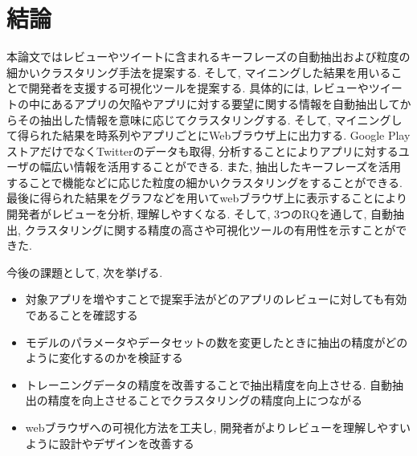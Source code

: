 \chapter{結論}
\label{chap:keturon}

本論文ではレビューやツイートに含まれるキーフレーズの自動抽出および粒度の細かいクラスタリング手法を提案する. そして, マイニングした結果を用いることで開発者を支援する可視化ツールを提案する. 
具体的には, レビューやツイートの中にあるアプリの欠陥やアプリに対する要望に関する情報を自動抽出してからその抽出した情報を意味に応じてクラスタリングする.  そして, マイニングして得られた結果を時系列やアプリごとにWebブラウザ上に出力する.
Google PlayストアだけでなくTwitterのデータも取得, 分析することによりアプリに対するユーザの幅広い情報を活用することができる. また, 抽出したキーフレーズを活用することで機能などに応じた粒度の細かいクラスタリングをすることができる. 最後に得られた結果をグラフなどを用いてwebブラウザ上に表示することにより開発者がレビューを分析, 理解しやすくなる. 
そして, 3つのRQを通して, 自動抽出, クラスタリングに関する精度の高さや可視化ツールの有用性を示すことができた. 

今後の課題として, 次を挙げる. 

\begin{itemize}
    \item 対象アプリを増やすことで提案手法がどのアプリのレビューに対しても有効であることを確認する
    \item モデルのパラメータやデータセットの数を変更したときに抽出の精度がどのように変化するのかを検証する
    \item トレーニングデータの精度を改善することで抽出精度を向上させる. 自動抽出の精度を向上させることでクラスタリングの精度向上につながる
    \item webブラウザへの可視化方法を工夫し, 開発者がよりレビューを理解しやすいように設計やデザインを改善する
\end{itemize}
